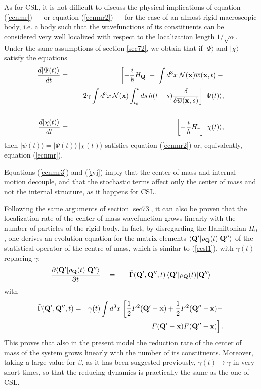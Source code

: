 \documentclass[10pt,a4paper]{article}
\begin{document}
As for CSL, it is not difficult to discuss the physical
implications of equation (\ref{ecnmr}) --- or equation
(\ref{ecnmr2}) --- for the case of an almost rigid macroscopic  body,
i.e. a body such that the wavefunctions of its constituents can be
considered very well localized with respect to the localization
length $1/\sqrt{\alpha}$. Under the same assumptions of section
\ref{sec72}, we obtain that if $|\Psi\rangle$ and $|\chi\rangle$
satisfy the equations
\begin{eqnarray} \label{ecnmr3}
\frac{d |\Psi(t)\rangle}{dt} & = & \left[ -\frac{i}{\hbar} H_{\bf
Q} \; + \; \int d^{3}x\, {\mathcal N}{(\bf x}) \overline{w}({\bf
x}, t) \; - \right.
\\ & &
\left. - \; 2\gamma \int d^{3}x\, {\mathcal N}({\bf x})
\int_{t_{0}}^{t} ds\, h(t - s) \frac{\delta}{\delta
\overline{w}({\bf x}, s)} \right]|\Psi(t)\rangle, \nonumber
\\
& & \nonumber
\\ \label{tyj} \frac{d |\chi (t)\rangle}{dt}
& = & \left[ -\frac{i}{\hbar} H_{r} \right] |\chi (t)\rangle,
\end{eqnarray}
then $|\psi(t)\rangle = |\Psi(t)\rangle\, |\chi (t)\rangle$
satisfies equation (\ref{ecnmr2}) or, equivalently, equation
(\ref{ecnmr}).

Equations (\ref{ecnmr3}) and (\ref{tyj}) imply that the center of
mass and internal motion decouple, and that the stochastic terms
affect only the center of mass and not the internal structure, as
it happens for CSL.

Following the same arguments of section \ref{sec73}, it can also
be proven that the localization rate of the center  of mass
wavefunction grows linearly with the number of particles of the
rigid body. In fact, by disregarding the Hamiltonian $H_{0}$, one
derives an evolution equation for the matrix elements $\langle
{\bf Q}'|\rho_{\bf Q}(t)|{\bf Q}''\rangle$ of the statistical
operator  of the centre of mass, which is similar to
(\ref{ecsl1}), with
$\gamma(t)$ replacing
$\gamma$:
\begin{equation}
\frac{\partial \langle {\bf Q}'|\rho_{\bf Q}(t)|{\bf
Q}''\rangle}{\partial t} \quad = \quad - \tilde{\Gamma}({\bf Q}',
{\bf Q}'', t) \, \langle {\bf Q}'|\rho_{\bf Q}(t)|{\bf Q}''\rangle
\end{equation}
with
\begin{eqnarray}
\tilde{\Gamma}({\bf Q}', {\bf Q}'', t) & = & \gamma(t) \int
d^{3}x\, \left[ \frac{1}{2} F^{2}({\bf Q}' - {\bf x}) +
\frac{1}{2}
F^{2}({\bf Q}'' - {\bf x}) - \right. \nonumber \\
& & \left. \frac{}{} F({\bf Q}' - {\bf x}) F({\bf Q}'' - {\bf x})
\right].
\end{eqnarray}
This proves that also in the present model the reduction rate of
the center of mass of the system grows linearly with the number of
its constituents. Moreover, taking a large value for $\beta$, as
it has been suggested previously, $\gamma(t) \rightarrow \gamma$
in very short times, so that the reducing dynamics is practically
the same as the one of CSL.
\end{document}
